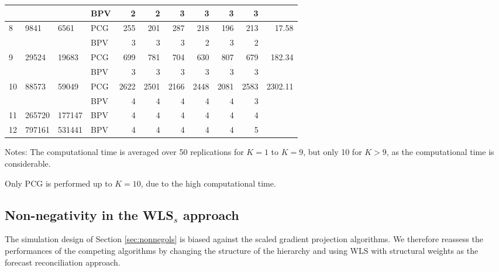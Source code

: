 \documentclass[11pt]{article}
\newcommand{\0}{\phantom{0}}
\begin{document}
\begin{table}[ht]
\begin{threeparttable}
\begin{tabular}{llllrrrrrrr}
			& & & BPV & 2 & 2 & 3 & 3 & 3 & 3 & \pmb{$0.31$} \\
			\midrule
			8 & 9841 & 6561 & PCG & 255 & 201 & 287 & 218 & 196 & 213 & 17.58 \\
			& & & BPV & 3 & 3 & 3 & 2 & 3 & 2 & \pmb{$1.13$} \\
			\midrule
			9 & 29524 & 19683 & PCG & 699 & 781 & 704 & 630 & 807 & 679 & 182.34 \\	
			& & & BPV & 3 & 3 & 3 & 3 & 3 & 3 & \pmb{$2.80$} \\	
			\midrule	
			10 & 88573 & 59049 & PCG & 2622 & 2501 & 2166 & 2448 & 2081 & 2583 & 2302.11 \\
			& & & BPV & 4 & 4 & 4 & 4 & 4 & 3 & \pmb{$9.33$} \\
			\midrule
			11 & 265720 & 177147 & BPV & 4 & 4 & 4 & 4 & 4 & 4 & \pmb{$28.99$}\\
			\midrule
			12 & 797161 & 531441 & BPV & 4 & 4 & 4 & 4 & 4 & 5 & \pmb{$98.57$}\\
			\bottomrule
		\end{tabular}
		\begin{tablenotes} 
			\item [] Notes: The computational time is averaged over 50 replications for $K = 1$ to $K = 9$, but only 10 for $K > 9$, as the computational time is considerable.
			\item [] Only PCG is performed up to $K = 10$, due to the high computational time.	
		\end{tablenotes}
	\end{threeparttable}
\end{table}

\clearpage

\subsection{Non-negativity in the WLS$_{s}$ approach}
\label{sec:nonnegwls}
The simulation design of Section \ref{sec:nonnegols} is biased against the scaled gradient projection algorithms. We therefore reassess the performances of the competing algorithms by changing the structure of the hierarchy and using WLS with structural weights as the forecast reconciliation approach. 
\end{document}

